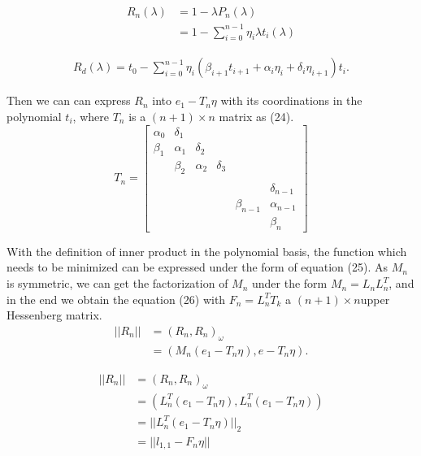 \begin{equation}
\begin{aligned}
R_n(\lambda)&=1-\lambda P_n(\lambda)\\ &=1-\sum_{i=0}^{n-1} \eta_i \lambda t_i(\lambda)
\end{aligned}
\end{equation}

\begin{equation}
\begin{aligned}
R_d(\lambda) =t_0-\sum_{i=0}^{n-1} \eta_i (\beta_{i+1}t_{i+1}+\alpha_i \eta_i + \delta_i \eta_{i+1})t_i.
\end{aligned}
\end{equation}

Then we can can express \(R_n\) into \(e_1-T_n \eta\) with its coordinations in the polynomial \(t_i\), where \(T_n\) is a \((n+1) \times n\) matrix as (24).
\begin{equation}
T_n=
\begin{bmatrix}
\alpha_0       & \delta_1  \\
\beta_1       & \alpha_1 & \delta_2  \\
&  \beta_2 & \alpha_2  & \delta_3\\
& \\
& && &&\delta_{n-1} \\
& && &\beta_{n-1}&\alpha_{n-1} \\
& && &&\beta_{n}
\end{bmatrix}
\end{equation}

With the definition of inner product in the polynomial basis, the function which needs to be minimized can be expressed under the form of equation (25). As \(M_n\) is symmetric, we can get the factorization of \(M_n\) under the form \(M_n=L_n L_n^T\), and in the end we obtain the equation (26) with \(F_n=L_n^TT_k\) a \((n+1) \times n\)upper Hessenberg matrix.
\begin{equation}
\begin{aligned}
||R_n|| &=(R_n,R_n)_\omega \\ &=(M_n(e_1-T_n\eta),e-T_n\eta).
\end{aligned}
\end{equation}

\begin{equation}
\begin{aligned}
||R_n|| &=(R_n,R_n)_\omega \\ &=(L_n^T(e_1-T_n\eta), L_n^T(e_1-T_n\eta)) \\ &=||L_n^T(e_1-T_n\eta)||_2 \\ &=||l_{1,1}-F_n\eta||
\end{aligned}
\end{equation}

